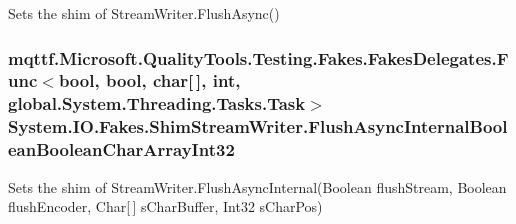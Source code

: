 Sets the shim of Stream\-Writer.\-Flush\-Async()

\hypertarget{class_system_1_1_i_o_1_1_fakes_1_1_shim_stream_writer_a986e05b09f6f78e307a0e902ec6178f5}{
\subsubsection[{Flush\-Async\-Internal\-Boolean\-Boolean\-Char\-Array\-Int32}]{\setlength{\rightskip}{0pt plus 5cm}mqttf.\-Microsoft.\-Quality\-Tools.\-Testing.\-Fakes.\-Fakes\-Delegates.\-Func$<$bool, bool, char\mbox{[}$\,$\mbox{]}, int, global.\-System.\-Threading.\-Tasks.\-Task$>$ System.\-I\-O.\-Fakes.\-Shim\-Stream\-Writer.\-Flush\-Async\-Internal\-Boolean\-Boolean\-Char\-Array\-Int32\hspace{0.3cm}{\ttfamily [set]}}}\label{class_system_1_1_i_o_1_1_fakes_1_1_shim_stream_writer_a986e05b09f6f78e307a0e902ec6178f5}


Sets the shim of Stream\-Writer.\-Flush\-Async\-Internal(\-Boolean flush\-Stream, Boolean flush\-Encoder, Char\mbox{[}$\,$\mbox{]} s\-Char\-Buffer, Int32 s\-Char\-Pos)

